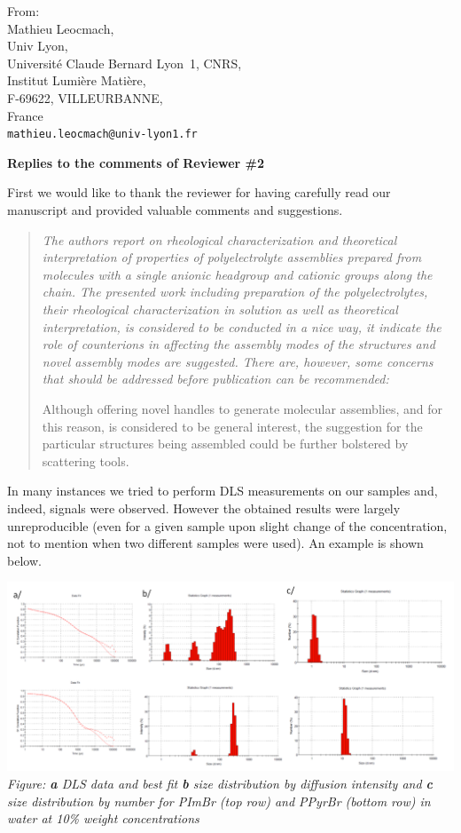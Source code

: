 \documentclass[a4paper, parskip=true, firsthead=false, fromemail=true, foldmarks=false]{scrlttr2}
\newenvironment{quotationi}
{\begin{quotation}\itshape}
{\end{quotation}}
\begin{document}
\begin{letter}{From:\\
Mathieu Leocmach,\\
Univ Lyon,\\ 
Universit\'e Claude Bernard Lyon~1, CNRS,\\
Institut Lumi\`ere Mati\`ere,\\
F-69622, VILLEURBANNE,\\
France\\
\texttt{mathieu.leocmach@univ-lyon1.fr}
}
\clearpage

\textsf{\textbf{Replies to the comments of Reviewer \#2}}

First we would like to thank the reviewer for having carefully read our manuscript and provided valuable comments and suggestions.

\begin{quotationi}
The authors report on rheological characterization and theoretical interpretation of properties of polyelectrolyte assemblies prepared from molecules with a single anionic headgroup and cationic groups along the chain. The presented work including preparation of the polyelectrolytes, their rheological characterization in solution as well as theoretical interpretation, is considered to be conducted in a nice way, it indicate the role of counterions in affecting the assembly modes of the structures and novel assembly modes are suggested. There are, however, some concerns that should be addressed before publication can be recommended:

Although offering novel handles to generate molecular assemblies, and for this reason, is considered to be general interest, the suggestion for the particular structures being assembled could be further bolstered by scattering tools.
\end{quotationi}

In many instances we tried to perform DLS measurements on our samples and, indeed, signals were observed. However the obtained results were largely unreproducible (even for a given sample upon slight change of the concentration, not to mention when two different samples were used). An example is shown below.

\includegraphics[width=\textwidth]{DLS.png}
\textit{Figure: \textbf{a} DLS data and best fit \textbf{b} size distribution by diffusion intensity and \textbf{c} size distribution by number for PImBr (top row) and PPyrBr (bottom row) in water at 10\% weight concentrations}


\end{letter}
\end{document}
